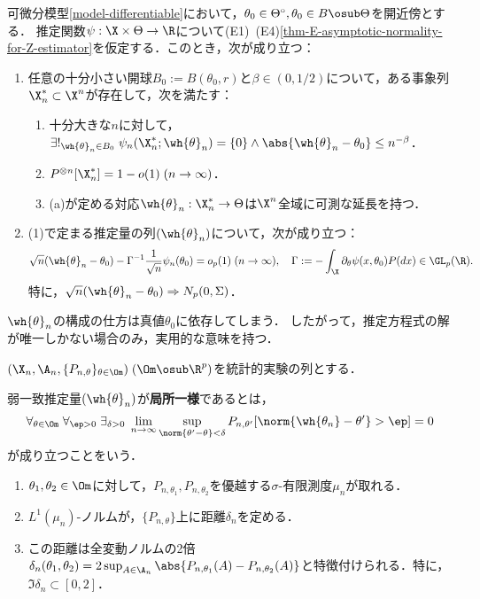 \documentclass[uplatex,dvipdfmx]{jsreport}
\begin{document}
\begin{theorem}[Cramer]
    可微分模型\ref{model-differentiable}において，$\theta_0\in\Theta^\circ,\theta_0\in B\osub\Theta$を開近傍とする．
    推定関数$\psi:\X\times\Theta\to\R$について(E1)~(E4)\ref{thm-E-asymptotic-normality-for-Z-estimator}を仮定する．このとき，次が成り立つ：
    \begin{enumerate}
        \item 任意の十分小さい開球$B_0:=B(\theta_0,r)$と$\beta\in(0,1/2)$について，ある事象列$\X_n^*\subset\X^n$が存在して，次を満たす：
        \begin{enumerate}
            \item 十分大きな$n$に対して，$\exists!_{\wh{\theta}_n\in B_0}\;\psi_n(\X^*_n;\wh{\theta}_n)=\{0\}\land\abs{\wh{\theta}_n-\theta_0}\le n^{-\beta}$．
            \item $P^{\otimes n}[\X^*_n]=1-o(1)\;(n\to\infty)$．
            \item (a)が定める対応$\wh{\theta}_n:\X^*_n\to\Theta$は$\X^n$全域に可測な延長を持つ．
        \end{enumerate}
        \item (1)で定まる推定量の列$(\wh{\theta}_n)$について，次が成り立つ：
        \[\sqrt{n}(\wh{\theta}_n-\theta_0)-\Gamma^{-1}\frac{1}{\sqrt{n}}\psi_n(\theta_0)=o_p(1)\;(n\to\infty),\quad\Gamma:=-\int_\X\partial_\theta\psi(x,\theta_0)P(dx)\in\GL_p(\R).\]
        特に，$\sqrt{n}(\wh{\theta}_n-\theta_0)\Rightarrow N_p(0,\Sigma)$．
    \end{enumerate}
\end{theorem}
\begin{remarks}
    $\wh{\theta}_n$の構成の仕方は真値$\theta_0$に依存してしまう．
    したがって，推定方程式の解が唯一しかない場合のみ，実用的な意味を持つ．
\end{remarks}

\begin{notation}
    $(\X_n,\A_n,\{P_{n,\theta}\}_{\theta\in\Om})\;(\Om\osub\R^p)$を統計的実験の列とする．
\end{notation}

\begin{definition}
    弱一致推定量$(\wh{\theta}_n)$が\textbf{局所一様}であるとは，
    \[\forall_{\theta\in\Om}\;\forall_{\ep>0}\;\exists_{\delta>0}\;\lim_{n\to\infty}\sup_{\norm{\theta'-\theta}<\delta}P_{n,\theta'}[\norm{\wh{\theta_n}-\theta'}>\ep]=0\]
    が成り立つことをいう．
\end{definition}

\begin{proposition}\mbox{}
    \begin{enumerate}
        \item $\theta_1,\theta_2\in\Om$に対して，$P_{n,\theta_1},P_{n,\theta_2}$を優越する$\sigma$-有限測度$\mu_n$が取れる．
        \item $L^1(\mu_n)$-ノルムが，$\{P_{n,\theta}\}$上に距離$\delta_n$を定める．
        \item この距離は全変動ノルムの2倍$\delta_n(\theta_1,\theta_2)=2\sup_{A\in\A_n}\abs{P_{n,\theta_1}(A)-P_{n,\theta_2}(A)}$と特徴付けられる．特に，$\Im\delta_n\subset[0,2]$．
    \end{enumerate}
\end{proposition}
\end{document}
